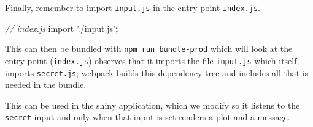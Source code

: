 \documentclass[10pt,]{krantz}
\makeatletter
\newenvironment{Shaded}{\begin{snugshade}}{\end{snugshade}}
\newcommand{\CommentTok}[1]{\textcolor[rgb]{0.37,0.37,0.37}{\textit{#1}}}
\newcommand{\ControlFlowTok}[1]{\textcolor[rgb]{0.27,0.27,0.27}{\textbf{#1}}}
\newcommand{\DataTypeTok}[1]{\textcolor[rgb]{0.27,0.27,0.27}{#1}}
\newcommand{\ImportTok}[1]{#1}
\newcommand{\KeywordTok}[1]{\textcolor[rgb]{0.27,0.27,0.27}{\textbf{#1}}}
\newcommand{\NormalTok}[1]{#1}
\newcommand{\OperatorTok}[1]{\textcolor[rgb]{0.43,0.43,0.43}{\textbf{#1}}}
\newcommand{\StringTok}[1]{\textcolor[rgb]{0.5,0.5,0.5}{#1}}
\newenvironment{kframe}{%
\medskip{}
\setlength{\fboxsep}{.8em}
 \def\at@end@of@kframe{}%
 \ifinner\ifhmode%
  \def\at@end@of@kframe{\end{minipage}}%
  \begin{minipage}{\columnwidth}%
 \fi\fi%
 \def\FrameCommand##1{\hskip\@totalleftmargin \hskip-\fboxsep
 \colorbox{shadecolor}{##1}\hskip-\fboxsep
     \hskip-\linewidth \hskip-\@totalleftmargin \hskip\columnwidth}%
 \MakeFramed {\advance\hsize-\width
   \@totalleftmargin\z@ \linewidth\hsize
   \@setminipage}}%
 {\par\unskip\endMakeFramed%
 \at@end@of@kframe}
\renewenvironment{Shaded}{\begin{kframe}}{\end{kframe}}
\makeatother
\begin{document}
Finally, remember to import \texttt{input.js} in the entry point \texttt{index.js}.

\begin{Shaded}
\begin{Highlighting}[]
\CommentTok{// index.js}
\ImportTok{import} \StringTok{'./input.js'}\OperatorTok{;}
\end{Highlighting}
\end{Shaded}

This can then be bundled with \texttt{npm\ run\ bundle-prod} which will look at the entry point (\texttt{index.js}) observes that it imports the file \texttt{input.js} which itself imports \texttt{secret.js}; webpack builds this dependency tree and includes all that is needed in the bundle.

This can be used in the shiny application, which we modify so it listens to the \texttt{secret} input and only when that input is set renders a plot and a message.

\begin{Shaded}
\end{Shaded}
\end{document}
